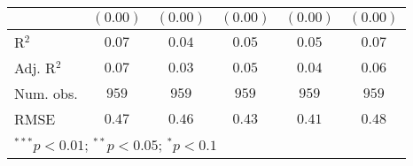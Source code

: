 \begin{table}
\begin{center}
\begin{tabular}{l c c c c c}
              & $(0.00)$      & $(0.00)$      & $(0.00)$      & $(0.00)$      & $(0.00)$      \\
\midrule
R$^2$         & $0.07$        & $0.04$        & $0.05$        & $0.05$        & $0.07$        \\
Adj. R$^2$    & $0.07$        & $0.03$        & $0.05$        & $0.04$        & $0.06$        \\
Num. obs.     & $959$         & $959$         & $959$         & $959$         & $959$         \\
RMSE          & $0.47$        & $0.46$        & $0.43$        & $0.41$        & $0.48$        \\
\bottomrule
\multicolumn{6}{l}{\scriptsize{$^{***}p<0.01$; $^{**}p<0.05$; $^{*}p<0.1$}}
\end{tabular}
\label{tab_emo}
\end{center}
\end{table}
